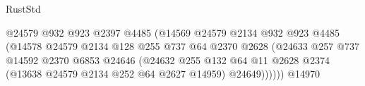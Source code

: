 \begin{lexlean}{RustStd}
\begin{coremodule}
                                                  @24579
                                                  @932
                                                  @923
                                                  @2397
                                                  @4485
                                                  (@14569
                                                    @24579
                                                    @2134
                                                    @932
                                                    @923
                                                    @4485
                                                    (@14578
                                                      @24579
                                                      @2134
                                                      @128
                                                      @255
                                                      @737
                                                      @64
                                                      @2370
                                                      @2628
                                                      (@24633
                                                        @257
                                                        @737
                                                        @14592
                                                        @2370
                                                        @6853
                                                        @24646
                                                        (@24632
                                                          @255
                                                          @132
                                                          @64
                                                          @11
                                                          @2628
                                                          @2374
                                                          (@13638
                                                            @24579
                                                            @2134
                                                            @252
                                                            @64
                                                            @2627
                                                            @14959)
                                                          @24649))))))
                                              @14970

\end{coremodule}
\end{lexlean}
